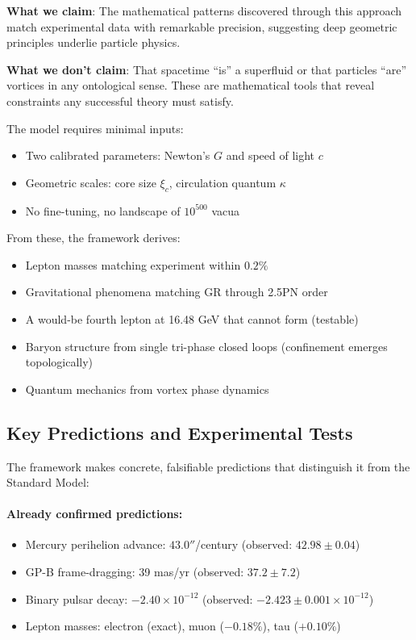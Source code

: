 \textbf{What we claim}: The mathematical patterns discovered through this approach match experimental data with remarkable precision, suggesting deep geometric principles underlie particle physics.

\textbf{What we don't claim}: That spacetime ``is'' a superfluid or that particles ``are'' vortices in any ontological sense. These are mathematical tools that reveal constraints any successful theory must satisfy.

The model requires minimal inputs:
\begin{itemize}
\item Two calibrated parameters: Newton's $G$ and speed of light $c$
\item Geometric scales: core size $\xi_c$, circulation quantum $\kappa$
\item No fine-tuning, no landscape of $10^{500}$ vacua
\end{itemize}

From these, the framework derives:
\begin{itemize}
\item Lepton masses matching experiment within $0.2\%$
\item Gravitational phenomena matching GR through 2.5PN order
\item A would-be fourth lepton at 16.48 GeV that cannot form (testable)
\item Baryon structure from single tri-phase closed loops (confinement emerges topologically)
\item Quantum mechanics from vortex phase dynamics
\end{itemize}

\subsection{Key Predictions and Experimental Tests}

The framework makes concrete, falsifiable predictions that distinguish it from the Standard Model:

\paragraph{Already confirmed predictions:}
\begin{itemize}
\item Mercury perihelion advance: $43.0''$/century (observed: $42.98 \pm 0.04$)
\item GP-B frame-dragging: 39 mas/yr (observed: $37.2 \pm 7.2$)
\item Binary pulsar decay: $-2.40\times10^{-12}$ (observed: $-2.423 \pm 0.001\times10^{-12}$)
\item Lepton masses: electron (exact), muon ($-0.18\%$), tau ($+0.10\%$)
\end{itemize}

